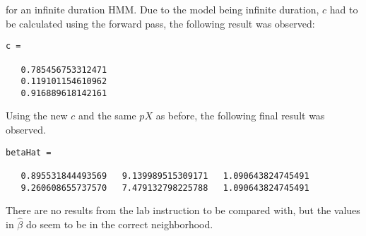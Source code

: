 \documentclass[]{article}
\begin{document}
for an infinite duration HMM. Due to the model being infinite duration,
\(c\) had to be calculated using the forward pass, the following result
was observed:

\begin{verbatim}
c =

   0.785456753312471
   0.119101154610962
   0.916889618142161
\end{verbatim}

Using the new \(c\) and the same \(pX\) as before, the following final
result was observed.

\begin{verbatim}
betaHat =

   0.895531844493569   9.139989515309171   1.090643824745491
   9.260608655737570   7.479132798225788   1.090643824745491
\end{verbatim}

There are no results from the lab instruction to be compared with, but
the values in \(\hat{\beta}\) do seem to be in the correct neighborhood.
\end{document}
